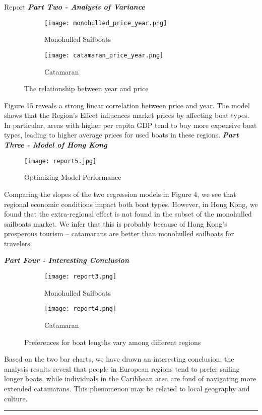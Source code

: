 \documentclass[12pt]{article}  %
\begin{document}
\begin{letter}{Report}
\noindent \textbf{\emph{Part Two - Analysis of Variance}}

\begin{figure}[htbp]
    \centering
    \begin{subfigure}[b]{.4\textwidth}
    \texttt{[image: monohulled\_price\_year.png]}
    \caption{Monohulled Sailboats}\label{subfig:report3}
    \end{subfigure}
    \begin{subfigure}[b]{.4\textwidth}
    \texttt{[image: catamaran\_price\_year.png]}
    \caption{Catamaran}\label{subfig:report4}
    \end{subfigure}
    \caption{The relationship between year and price}\label{fig:Report2}
\end{figure} 

Figure 15 reveals a strong linear correlation between price and year. The model shows that the Region's Effect influences market prices by affecting boat types. In particular, areas with higher per capita GDP tend to buy more expensive boat types, leading to higher average prices for used boats in these regions.
\clearpage
\noindent \textbf{\emph{Part Three - Model of Hong Kong}}

\begin{figure}[htbp]
    \centering
    \texttt{[image: report5.jpg]}
    \caption{Optimizing Model Performance}\label{fig:Report3}
\end{figure}

Comparing the slopes of the two regression models in Figure 4, we see that regional economic conditions impact both boat types. However, in Hong Kong, we found that the extra-regional effect is not found in the subset of the monohulled sailboats market. We infer that this is probably because of Hong Kong's prosperous tourism -- catamarans are better than monohulled sailboats for travelers.

\noindent \textbf{\emph{Part Four - Interesting Conclusion}}

\begin{figure}[htbp]
    \centering
    \begin{subfigure}[b]{.45\textwidth}
    \texttt{[image: report3.png]}
    \caption{Monohulled Sailboats}\label{subfig:report5}
    \end{subfigure}
    \begin{subfigure}[b]{.4\textwidth}
    \texttt{[image: report4.png]}
    \caption{Catamaran}\label{subfig:report6}
    \end{subfigure}
    \caption{Preferences for boat lengths vary among different regions}\label{fig:Report4}
\end{figure} 

Based on the two bar charts, we have drawn an interesting conclusion: the analysis results reveal that people in European regions tend to prefer sailing longer boats, while individuals in the Caribbean area are fond of navigating more extended catamarans. This phenomenon may be related to local geography and culture.

\noindent\rule[0.25\baselineskip]{\textwidth}{2pt} 
\end{letter}
\end{document}
